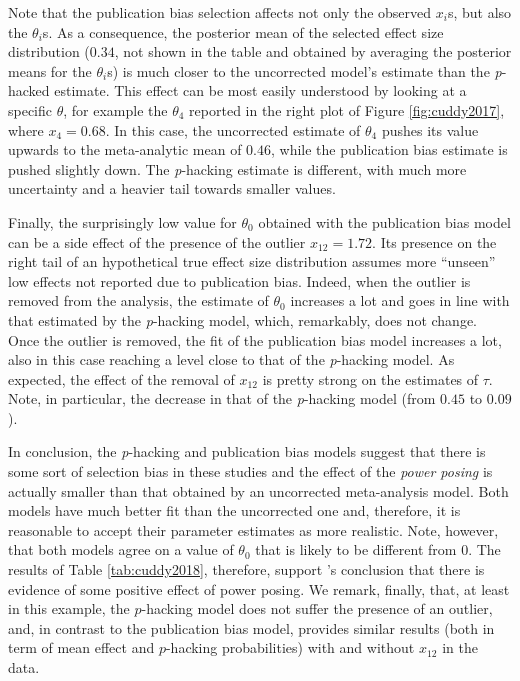 \documentclass[preprint, authoryear]{elsarticle}
\theoremstyle{plain}
\theoremstyle{definition}
\begin{document}
Note that the publication bias selection affects not only the observed $x_{i}$s, but also the $\theta_{i}$s. As a consequence, the posterior mean of the selected effect size distribution ($0.34$, not shown in the table and obtained by averaging the posterior means for the $\theta_{i}$s) is much closer to the uncorrected model's estimate than the \emph{p}-hacked estimate. This effect can be most easily understood by looking at a specific $\theta$, for example the $\theta_4$ reported in the right plot of Figure \ref{fig:cuddy2017}, where $x_{4}=0.68$. In this case, the uncorrected estimate of $\theta_{4}$ pushes its value upwards to the meta-analytic mean of $0.46$, while the publication bias estimate is pushed slightly down. The \emph{p}-hacking estimate is different, with much more uncertainty and a heavier tail towards smaller values.

Finally, the surprisingly low value for $\theta_0$ obtained with the publication bias model can be a side effect of the presence of the outlier $x_{12} = 1.72$. Its presence on the right tail of an hypothetical true effect size distribution assumes more ``unseen'' low effects not reported due to publication bias. Indeed, when the outlier is removed from the analysis, the estimate of $\theta_{0}$ increases a lot and goes in line with that estimated by the \emph{p}-hacking model, which, remarkably, does not change. Once the outlier is removed, the fit of the publication bias model increases a lot, also in this case reaching a level close to that of the \emph{p}-hacking model. As expected, the effect of the removal of $x_{12}$ is pretty strong on the estimates of $\tau$. Note, in particular, the decrease in that of the \emph{p}-hacking model (from $0.45$ to $0.09$).



In conclusion, the \emph{p}-hacking and publication bias models suggest that there is some sort of selection bias in these studies and the effect of the \emph{power posing} is actually smaller than that obtained by an uncorrected meta-analysis model. Both models have much better fit than the uncorrected one and, therefore, it is reasonable to accept their parameter estimates as more realistic. Note, however, that both models agree on  a value of $\theta_{0}$ that is likely to be different from $0$. The results of Table \ref{tab:cuddy2018}, therefore, support \citet{cuddy2018p}'s conclusion that there is evidence of some positive effect of power posing. We remark, finally, that, at least in this example, the $p$-hacking model does not suffer the presence of an outlier, and, in contrast to the publication bias model, provides similar results (both in term of mean effect and $p$-hacking probabilities) with and without $x_{12}$ in the data.
\end{document}
